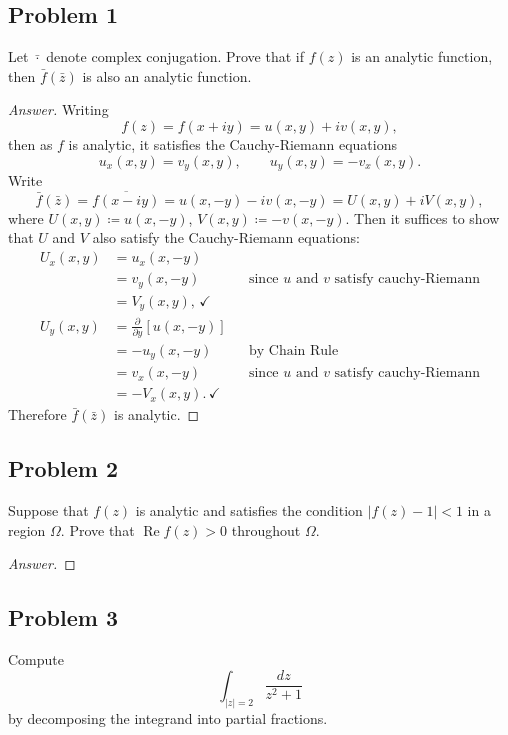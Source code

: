 \documentclass[12pt]{article}
\newcommand\paren[1]{\left( #1 \right)}
\newcommand{\sqbrack}[1]{\left [ #1 \right ]}
\newcommand{\abs}[1]{\left| #1 \right|}
\theoremstyle{definition}
\DeclareMathOperator\re{Re}
\begin{document}
\subsection{Problem 1}
Let $\bar{\cdot}$ denote complex conjugation. Prove that if $f(z)$ is an analytic function, then $\bar{f}(\bar{z})$ is also an analytic function. 
\begin{proof}[Answer]
    Writing 
    \[
        f(z) = f(x + iy) = u(x,y) + i v(x,y) , 
    \]
    then as $f$ is analytic, it satisfies the Cauchy-Riemann equations
    \[
        u_x(x,y) = v_y(x,y) , \qquad u_y(x,y) = - v_x(x,y) . 
    \]
    Write 
    \[
        \bar{f} \paren{ \bar{z} } = \overline{ f(x - iy) } = u(x,-y) - i v(x,-y) = U(x,y) + i V(x,y) , 
    \]
    where $U(x,y) \coloneqq u(x,-y)$, $V(x,y) \coloneqq -v(x,-y)$. Then it suffices to show that $U$ and $V$ also satisfy the Cauchy-Riemann equations: 
    \begin{align*}
        U_x(x,y) & = u_x(x,-y) \\ 
        & = v_y(x,-y) && \text{since $u$ and $v$ satisfy cauchy-Riemann} \\ 
        & = V_y(x,y) , \, \checkmark \\ 
        U_y(x,y) & = \frac{\partial}{\partial y} \sqbrack{ u(x,-y) } \\ 
        & = - u_y(x,-y) && \text{by Chain Rule} \\ 
        & = v_x(x,-y) && \text{since $u$ and $v$ satisfy cauchy-Riemann} \\ 
        & = -V_x(x,y) . \, \checkmark 
    \end{align*}
    Therefore $\bar{f} \paren{ \bar{z} }$ is analytic. 
\end{proof}

\subsection{Problem 2}
Suppose that $f(z)$ is analytic and satisfies the condition $\abs{f(z) - 1} < 1$ in a region $\Omega$. Prove that $\re f(z) > 0$ throughout $\Omega$.
\begin{proof}[Answer]
    
\end{proof}

\subsection{Problem 3}
Compute 
\[
    \int_{\abs{z} = 2} \frac{dz}{z^2 + 1}
\]
by decomposing the integrand into partial fractions. 
\end{document}
